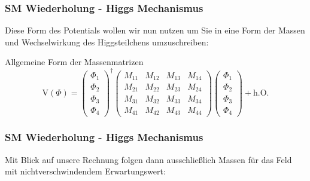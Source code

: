 \documentclass{beamer}
\begin{document}
\begin{frame}
\frametitle{SM Wiederholung - Higgs Mechanismus }
Diese Form des Potentials wollen wir nun nutzen um Sie in eine Form der Massen und Wechselwirkung des Higgsteilchens umzuschreiben:
\begin{block}{Allgemeine Form der Massenmatrizen}
\begin{equation}
\text{V}(\Phi)=\left( \begin{array}{c} \Phi_{1}\\ \Phi_{2} \\ \Phi_{3} \\ \Phi_{4} \end{array}\right)^{\dagger}  \begin{pmatrix} M_{11}&M_{12}&M_{13}&M_{14}\\M_{21}&M_{22}&M_{23}&M_{24} \\ M_{31}&M_{32}&M_{33}&M_{34}\\ M_{41}&M_{42}&M_{43}&M_{44}\end{pmatrix}\left( \begin{array}{c} \Phi_{1}\\ \Phi_{2} \\ \Phi_{3} \\ \Phi_{4} \end{array}\right) + \text{h.O.}
\end{equation}
\end{block}
\end{frame} 

\begin{frame}
\frametitle{SM Wiederholung - Higgs Mechanismus }
Mit Blick auf unsere Rechnung folgen dann ausschließlich Massen für das Feld mit nichtverschwindendem Erwartungswert:




\end{frame}
\end{document}
